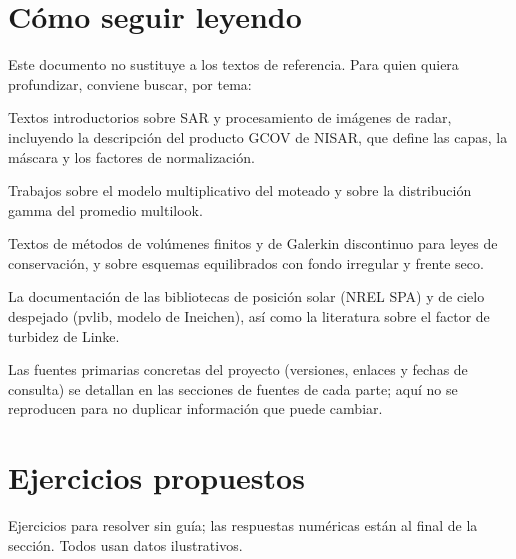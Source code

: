 \documentclass[11pt,a4paper]{article}
\begin{document}
\section{Cómo seguir leyendo}
\label{sec:lecturas}

Este documento no sustituye a los textos de referencia. Para quien quiera profundizar, conviene buscar, por tema:
\begin{description}[style=nextline]
  \item[Radar de apertura sintética.] Textos introductorios sobre SAR y procesamiento de imágenes de radar,
        incluyendo la descripción del producto GCOV de NISAR, que define las capas, la máscara y los factores de
        normalización.
  \item[Estadística del moteado.] Trabajos sobre el modelo multiplicativo del moteado y sobre la distribución
        gamma del promedio multilook.
  \item[Aguas someras y métodos DG.] Textos de métodos de volúmenes finitos y de Galerkin discontinuo para
        leyes de conservación, y sobre esquemas equilibrados con fondo irregular y frente seco.
  \item[Radiación solar.] La documentación de las bibliotecas de posición solar (NREL SPA) y de cielo despejado
        (pvlib, modelo de Ineichen), así como la literatura sobre el factor de turbidez de Linke.
\end{description}
Las fuentes primarias concretas del proyecto (versiones, enlaces y fechas de consulta) se detallan en las
secciones de fuentes de cada parte; aquí no se reproducen para no duplicar información que puede cambiar.


\section{Ejercicios propuestos}
\label{sec:propuestos}

Ejercicios para resolver sin guía; las respuestas numéricas están al final de la sección. Todos usan datos
ilustrativos.
\end{document}
